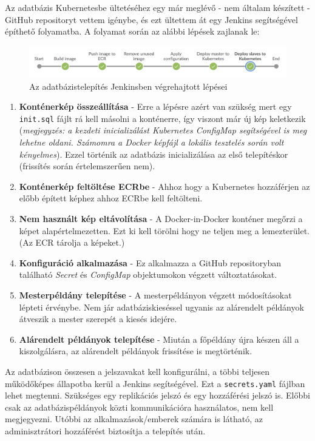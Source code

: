 Az adatbázis Kubernetesbe ültetéséhez egy már meglévő - nem általam készített - GitHub repositoryt\cite{postgres_k8s} vettem igénybe, és ezt ültettem át egy Jenkins segítségével építhető folyamatba.
\clearpage
A folyamat során az alábbi lépések zajlanak le:
\begin{figure}[ht]
\centering
\includegraphics[width=150mm, keepaspectratio]{img/dbjenkins.png}
\caption{Az adatbázistelepítés Jenkinsben végrehajtott lépései}
\end{figure}
\vskip 0.1in
\begin{enumerate}
    \item \textbf{Konténerkép összeállítása} - Erre a lépésre azért van szükség mert egy \lstinline{init.sql} fájlt rá kell másolni a konténerre, így viszont már új kép keletkezik (\textit{megjegyzés: a kezdeti inicializálást Kubernetes ConfigMap segítségével is meg lehetne oldani. Számomra a Docker képfájl a lokális tesztelés során volt kényelmes}). Ezzel történik az adatbázis inicializálása az első telepítéskor (frissítés során értelemszerűen nem).
    \item \textbf{Konténerkép feltöltése ECRbe} - Ahhoz hogy a Kubernetes hozzáférjen az előbb épített képhez ahhoz ECRbe kell feltölteni.
    \item \textbf{Nem használt kép eltávolítása} - A Docker-in-Docker konténer megőrzi a képet alapértelmezetten. Ezt ki kell törölni hogy ne teljen meg a lemezterület. (Az ECR tárolja a képeket.)
    \item \textbf{Konfiguráció alkalmazása} - Ez alkalmazza a GitHub repositoryban található \textit{Secret} és \textit{ConfigMap} objektumokon végzett változtatásokat.
    \item \textbf{Mesterpéldány telepítése} - A mesterpéldányon végzett módosításokat lépteti érvénybe. Nem jár adatbáziskieséssel ugyanis az alárendelt példányok átveszik a mester szerepét a kiesés idejére.
    \item \textbf{Alárendelt példányok telepítése} - Miután a főpéldány újra készen áll a kiszolgálásra, az alárendelt példányok frissítése is megtörténik.
\end{enumerate}
Az adatbázison összesen a jelszavakat kell konfigurálni, a többi teljesen működőképes állapotba kerül a Jenkins segítségével. Ezt a \lstinline{secrets.yaml} fájlban lehet megtenni. Szükséges egy replikációs jelszó és egy hozzáférési jelszó is. Előbbi csak az adatbázispéldányok közti kommunikációra használatos, nem kell megjegyezni. Utóbbi az alkalmazások/emberek számára is látható, az adminisztrátori hozzáférést biztosítja a telepítés után.
